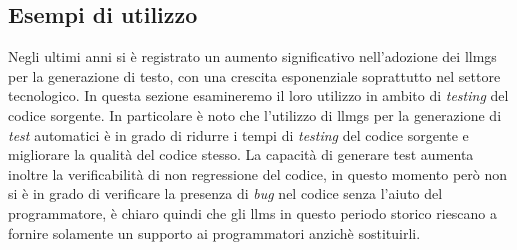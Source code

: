     \subsection{Esempi di utilizzo}
    Negli ultimi anni si è registrato un aumento significativo nell'adozione dei \glspl{llmg} per la generazione di testo, con una crescita esponenziale soprattutto nel settore tecnologico.
    In questa sezione esamineremo il loro utilizzo in ambito di \textit{testing} del codice sorgente.
    In particolare è noto che l'utilizzo di \glspl{llmg} per la generazione di \textit{test} automatici è in grado di ridurre i tempi di \textit{testing} del codice sorgente e migliorare la qualità del codice stesso\cite{article:Alshahwan2024AutomatedUT}.
    La capacità di generare test aumenta inoltre la verificabilità di non regressione del codice, in questo momento però non si è in grado di verificare la presenza di \textit{bug} nel codice senza l'aiuto del programmatore, è chiaro quindi che gli \glspl{llm} in questo periodo storico riescano a fornire solamente un supporto ai programmatori anzichè sostituirli.
